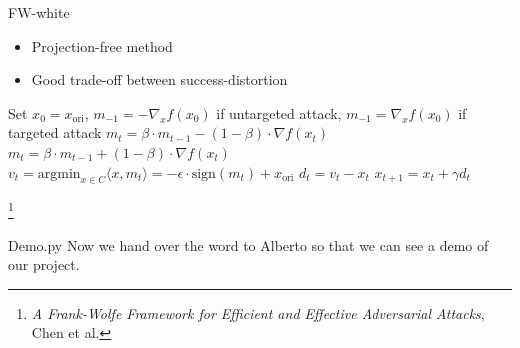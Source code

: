 \documentclass{beamer}
\theoremstyle{plain}
\theoremstyle{definition}
\newcommand\blfootnote[1]{%
  \begingroup
  \renewcommand\thefootnote{}\footnote{#1}%
  \addtocounter{footnote}{-1}%
  \endgroup
}
\begin{document}
\begin{frame}{FW-white}
\begin{itemize}
    \item Projection-free method 
    \item Good trade-off between success-distortion 
\end{itemize}
    \begin{algorithm}[H]
\caption{FW-White}\label{FW}
\begin{algorithmic}[1]
\State Set $x_0 = x_{\text{ori}}$, $m_{-1} = - \nabla_x f(x_0)$ if untargeted attack, $m_{-1} = \nabla_x f(x_0)$ if targeted attack
    \State $m_t = \beta \cdot m_{t-1} - (1-\beta) \cdot \nabla f(x_t) $ 
    \State $m_t = \beta \cdot m_{t-1} + (1-\beta) \cdot \nabla f(x_t) $ 
    \State $v_t = \text{argmin}_{x \in C} \langle x, m_t \rangle = - \epsilon \cdot \text{sign} (m_t) + x_{\text{ori}} $
    \State $d_t = v_t - x_t $
    \State $x_{t+1} = x_t + \gamma d_t $
    
\EndFor
\end{algorithmic}
\end{algorithm}

\blfootnote{\textit{A Frank-Wolfe Framework for Efficient and Effective
Adversarial Attacks}, Chen et al.}
\end{frame}

\begin{frame}{Demo.py}
    Now we hand over the word to Alberto so that we can see a demo of our project. 
\end{frame}
\end{document}
